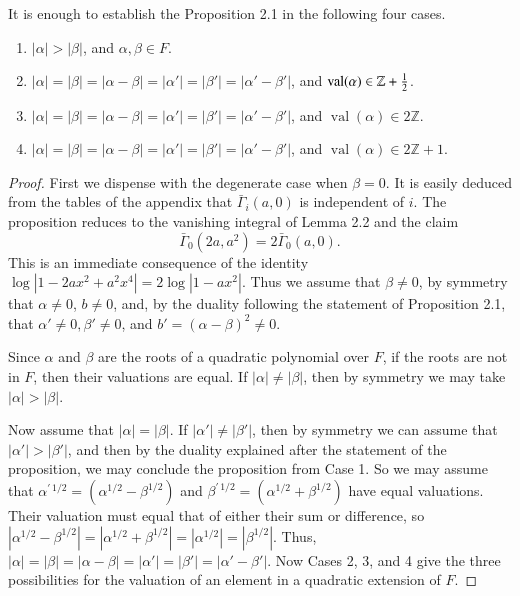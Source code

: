 \documentclass{amsart}
\newcommand\bGamma{\bar\Gamma}
\newcommand\val{\operatorname{val}}
\newenvironment{cthm}[1]
  {\renewcommand\thethm{\sc #1}\thm}
  {\endthm}
\begin{document}
\bigskip
\noindent
\begin{cthm}{Lemma 2.3}  It is enough to establish the Proposition 2.1 
in the following
four cases.  %
\begin{enumerate}[label=(\arabic*)]
\item $|\alpha|>|\beta|$, and $\alpha,\beta\in F$.
\item $|\alpha|=|\beta| = |\alpha-\beta|=|\alpha'|=|\beta'|=|\alpha'-\beta'|$,
and $\val(\alpha)\in {\mathbb Z} + {1\over 2}$.
\item $|\alpha|=|\beta| = |\alpha-\beta|=|\alpha'|=|\beta'|=|\alpha'-\beta'|$,
and $\val(\alpha)\in 2{\mathbb Z}$.
%
\item $|\alpha|=|\beta| = |\alpha-\beta|=|\alpha'|=|\beta'|=|\alpha'-\beta'|$,
and $\val(\alpha)\in 2{\mathbb Z}+1$.
\end{enumerate}
\end{cthm}

\noindent
\begin{proof}  First we dispense with the degenerate case when $\beta=0$.
It is easily deduced from the tables of the appendix that $\bGamma_i(a,0)$
is independent of $i$.  The proposition reduces to the vanishing integral
of Lemma 2.2 and the claim
$$\bGamma_0(2a,a^2) = 2\bGamma_0(a,0).$$
This is an immediate consequence of the identity
$\log|1-2a x^2+a^2 x^4| = 2\log|1-a x^2|$.
Thus we assume that $\beta\ne0$, by symmetry that $\alpha\ne0$,
$b\ne 0$, and, by the duality following the statement of
Proposition 2.1, that $\alpha'\ne0,\beta'\ne0$, 
and $b'=(\alpha-\beta)^2\ne0$.

Since $\alpha$ and $\beta$ are the roots of a quadratic
polynomial over $F$, if the roots are not in $F$, then their valuations
are equal.  If $|\alpha|\ne |\beta|$, then by symmetry we may take
$|\alpha|>|\beta|$.

Now assume that $|\alpha|=|\beta|$.  If $|\alpha'|\ne |\beta'|$, then
by symmetry we can assume that $|\alpha'|>|\beta'|$, and then by
the duality explained after the 
statement of the proposition, we may conclude the
proposition from Case 1.  So we may assume that 
$\alpha^{\prime\,1/2} = (\alpha^{1/2}-\beta^{1/2})$ and 
$\beta^{\prime\,1/2} = (\alpha^{1/2}+\beta^{1/2})$ have equal valuations.
Their valuation must equal that of either their sum or difference,
so $|\alpha^{1/2}-\beta^{1/2}| = |\alpha^{1/2}+\beta^{1/2}| = |\alpha^{1/2}|
= |\beta^{1/2}|$.  Thus, $|\alpha|=|\beta|=|\alpha-\beta| =
|\alpha'|=|\beta'| = |\alpha'-\beta'|$.   Now Cases 2, 3, and 4 give
the three possibilities for the valuation of an element in a quadratic
extension of $F$.
\end{proof}
\end{document}
